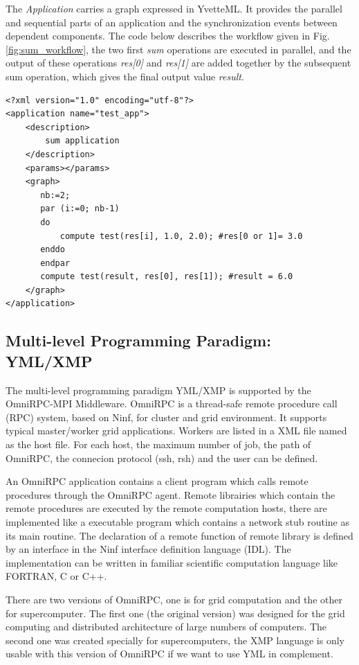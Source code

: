 The \textit{Application} carries a graph expressed in YvetteML. It provides the parallel and sequential parts of an application and the synchronization events between dependent components. The code below describes the workflow given in Fig. \ref{fig:sum_workflow}, the two first \textit{sum} operations are executed in parallel, and the output of these operations \textit{res[0]} and \textit{res[1]} are added together by the subsequent sum operation, which gives the final output value \textit{result}.

\lstset{language=XML}
\begin{lstlisting}[frame=single]
<?xml version="1.0" encoding="utf-8"?>
<application name="test_app">
    <description>
        sum application
    </description>
    <params></params>
    <graph>
       nb:=2;
       par (i:=0; nb-1)
       do
           compute test(res[i], 1.0, 2.0); #res[0 or 1]= 3.0
       enddo
       endpar
       compute test(result, res[0], res[1]); #result = 6.0
    </graph>
</application>
\end{lstlisting}

\subsection{Multi-level Programming Paradigm: YML/XMP}

The multi-level programming paradigm YML/XMP is supported by the OmniRPC-MPI Middleware. OmniRPC is a thread-safe remote procedure call (RPC) system, based on Ninf, for cluster and grid environment. It supports typical master/worker grid applications. Workers are listed in a XML file named as the host file. For each host, the maximum number of job, the path of OmniRPC, the connecion protocol (ssh, rsh) and the user can be defined.

An OmniRPC application contains a client program which calls remote procedures through the OmniRPC agent. Remote librairies which contain the remote procedures are executed by the remote computation hosts, there are implemented like a executable program which contains a network stub routine as its main routine. The declaration of a remote function of remote library is defined by an interface in the Ninf interface definition language (IDL). The implementation can be written in familiar scientific computation language like FORTRAN, C or C++.

There are two versions of OmniRPC, one is for grid computation and the other for supercomputer. The first one (the original version) was designed for the grid computing and distributed architecture of large numbers of computers. The second one was created specially for supercomputers, the XMP language is only usable with this version of OmniRPC if we want to use YML in complement.

